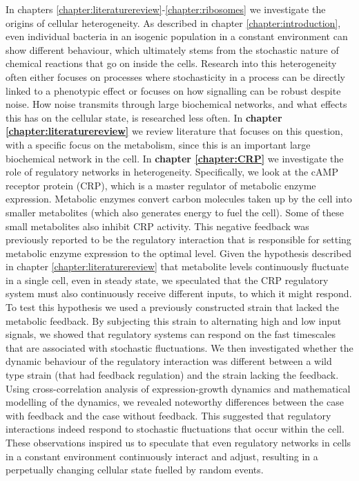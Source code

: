 In chapters \ref{chapter:literaturereview}-\ref{chapter:ribosomes} we investigate the origins of cellular heterogeneity.
%
As described in chapter \ref{chapter:introduction}, 
even individual bacteria in an isogenic population in a constant environment can show different behaviour,
which ultimately stems from the stochastic nature of 
chemical reactions that go on inside the cells.
%
Research into this heterogeneity often either focuses on processes where stochasticity in a process can be directly linked to a phenotypic effect
or focuses on how signalling can be robust despite noise.
%
How noise transmits through large biochemical networks, and what effects this has on the cellular state, is researched less often.
%
In
\textbf{chapter \ref{chapter:literaturereview}} we review literature that focuses on this question,
with a specific focus on the metabolism, 
since this 
is an important large biochemical network in the cell.
%
In \textbf{chapter \ref{chapter:CRP}} we investigate the role of regulatory networks in heterogeneity. %
%
Specifically, we look at the 
cAMP receptor protein (CRP), 
which is a master regulator of metabolic enzyme expression.
%
Metabolic enzymes convert carbon molecules taken up by the cell into smaller metabolites 
(which also generates energy to fuel the cell). %
%
Some of these small metabolites also inhibit CRP activity.
This negative feedback was previously reported to be the regulatory interaction that is responsible for 
setting metabolic enzyme expression to the optimal level.
%
Given the hypothesis described in chapter \ref{chapter:literaturereview} that metabolite levels continuously fluctuate in a single cell, even in steady state, 
we speculated that the CRP regulatory system must also continuously receive different inputs, to which it might respond.
%
To test this hypothesis we used a previously constructed \ecoli strain that lacked the metabolic feedback. %
By subjecting this strain to alternating high and low input signals, 
we showed that regulatory systems can respond on the fast timescales that are associated with stochastic fluctuations.
%
We then investigated whether the dynamic behaviour of the regulatory interaction was different 
between a wild type strain (that had feedback regulation) and the strain lacking the feedback.
%
Using cross-correlation analysis of expression-growth dynamics and mathematical modelling of the dynamics,
we revealed noteworthy differences between the case with feedback and the case without feedback.
%
This suggested that regulatory interactions indeed respond to stochastic fluctuations that occur within the cell.
%
These observations inspired us to speculate that 
even regulatory networks in cells in a constant environment 
continuously interact and adjust, 
resulting in a perpetually changing cellular state fuelled by random events.




